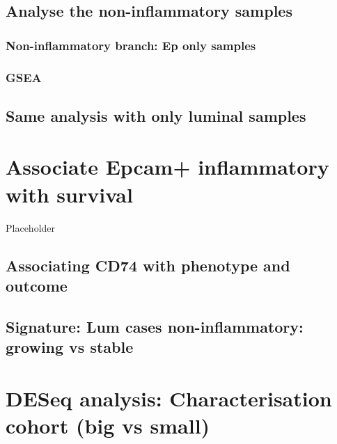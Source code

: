 \documentclass[
]{book}
\begin{document}
\hypertarget{analyse-the-non-inflammatory-samples}{%
\section{Analyse the non-inflammatory samples}\label{analyse-the-non-inflammatory-samples}}

\hypertarget{non-inflammatory-branch-ep-only-samples}{%
\subsection{Non-inflammatory branch: Ep only samples}\label{non-inflammatory-branch-ep-only-samples}}

\hypertarget{gsea}{%
\subsection{GSEA}\label{gsea}}

\hypertarget{same-analysis-with-only-luminal-samples}{%
\section{Same analysis with only luminal samples}\label{same-analysis-with-only-luminal-samples}}

\hypertarget{associate-epcam-inflammatory-with-survival}{%
\chapter{Associate Epcam+ inflammatory with survival}\label{associate-epcam-inflammatory-with-survival}}

Placeholder

\hypertarget{associating-cd74-with-phenotype-and-outcome}{%
\section{Associating CD74 with phenotype and outcome}\label{associating-cd74-with-phenotype-and-outcome}}

\hypertarget{signature-lum-cases-non-inflammatory-growing-vs-stable}{%
\section{Signature: Lum cases non-inflammatory: growing vs stable}\label{signature-lum-cases-non-inflammatory-growing-vs-stable}}

\hypertarget{deseq-analysis-characterisation-cohort-big-vs-small}{%
\chapter{DESeq analysis: Characterisation cohort (big vs small)}\label{deseq-analysis-characterisation-cohort-big-vs-small}}
\end{document}
